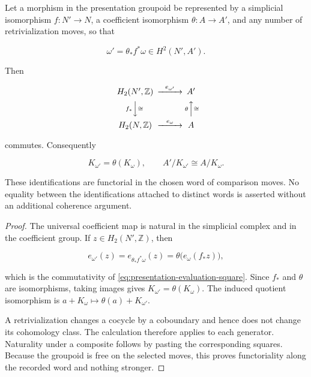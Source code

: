 \begin{proposition}
\label{prop:presentation-comparison-naturality}
Let a morphism in the presentation groupoid be represented by a simplicial
isomorphism \(f:N'\to N\), a coefficient isomorphism
\(\theta:A\to A'\), and any number of retrivialization moves, so that

\[
 \omega'=\theta_*f^*\omega\in H^2(N',A').
\]

Then

\begin{equation}\label{eq:presentation-evaluation-square}
\begin{CD}
H_2(N',\mathbb Z) @>{e_{\omega'}}>> A'\\
@V{f_*}V{\cong}V @A{\theta}A{\cong}A\\
H_2(N,\mathbb Z) @>{e_\omega}>> A
\end{CD}
\end{equation}

commutes.  Consequently

\[
 K_{\omega'}=\theta(K_\omega),
 \qquad
 A'/K_{\omega'}\cong A/K_\omega.
\]

These identifications are functorial in the chosen word of comparison moves.
No equality between the identifications attached to distinct words is
asserted without an additional coherence argument.
\end{proposition}

\begin{proof}
The universal coefficient map is natural in the simplicial complex and in
the coefficient group.  If \(z\in H_2(N',\mathbb Z)\), then

\[
 e_{\omega'}(z)
 =e_{\theta_*f^*\omega}(z)
 =\theta\bigl(e_\omega(f_*z)\bigr),
\]

which is the commutativity of
\eqref{eq:presentation-evaluation-square}.  Since \(f_*\) and \(\theta\)
are isomorphisms, taking images gives
\(K_{\omega'}=\theta(K_\omega)\).  The induced quotient isomorphism is
\(a+K_\omega\mapsto\theta(a)+K_{\omega'}\).

A retrivialization changes a cocycle by a coboundary and hence does not
change its cohomology class.  The calculation therefore applies to each
generator.  Naturality under a composite follows by pasting the corresponding
squares.  Because the groupoid is free on the selected moves, this proves
functoriality along the recorded word and nothing stronger.
\end{proof}

